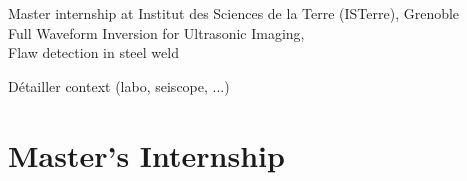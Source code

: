 \documentclass[11pt,xcolor=x11names,compress, notes=show]{beamer}%
\begin{document}
\begin{frame}
	
	
	
\end{frame}

\begin{frame}
	Master internship at Institut des Sciences de la Terre (ISTerre), Grenoble\\
	Full Waveform Inversion for Ultrasonic Imaging,\\
	Flaw detection in steel weld
	
	Détailler context (labo, seiscope, ...)
	
\end{frame}


 \section{Master's Internship}
\end{document}
